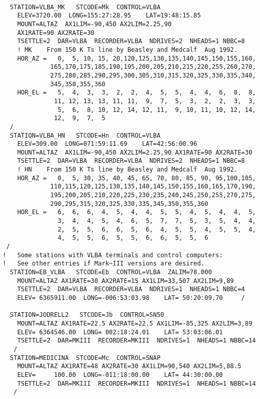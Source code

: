 \documentclass{report}
\begin{document}
\begin{verbatim}

  STATION=VLBA_MK   STCODE=Mk  CONTROL=VLBA
    ELEV=3720.00  LONG=155:27:28.95    LAT=19:48:15.85
    MOUNT=ALTAZ  AX1LIM=-90,450 AX2LIM=2.25,90
    AX1RATE=90 AX2RATE=30
    TSETTLE=2  DAR=VLBA  RECORDER=VLBA  NDRIVES=2  NHEADS=1 NBBC=8
    ! MK    From 150 K Ts line by Beasley and Medcalf  Aug 1992.
    HOR_AZ =   0,  5, 10, 15, 20,120,125,130,135,140,145,150,155,160,
             165,170,175,185,190,195,200,205,210,215,220,255,260,270,
             275,280,285,290,295,300,305,310,315,320,325,330,335,340,
             345,350,355,360
    HOR_EL =   5,  4,  3,  3,  2,  2,  4,  5,  5,  4,  4,  6,  8,  8,
              11, 12, 13, 13, 11, 11,  9,  7,  5,  3,  2,  2,  3,  3,
               5,  6,  8, 10, 12, 14, 12, 11,  9, 10, 11, 10, 12, 14,
              12,  9,  7,  5
  /
  STATION=VLBA_HN   STCODE=Hn  CONTROL=VLBA
    ELEV=309.00  LONG=071:59:11.69    LAT=42:56:00.96
    MOUNT=ALTAZ  AX1LIM=-90,450 AX2LIM=2.25,90 AX1RATE=90 AX2RATE=30
    TSETTLE=2  DAR=VLBA  RECORDER=VLBA  NDRIVES=2  NHEADS=1 NBBC=8
    ! HN    From 150 K Ts line by Beasley and Medcalf  Aug 1992.
    HOR_AZ =   0,  5, 30, 35, 40, 45, 65, 70, 80, 85, 90, 95,100,105,
             110,115,120,125,130,135,140,145,150,155,160,165,170,190,
             195,200,205,210,220,225,230,235,240,245,250,255,270,275,
             290,295,315,320,325,330,335,345,350,355,360
    HOR_EL =   6,  6,  6,  4,  5,  4,  4,  5,  5,  4,  5,  4,  4,  5,
               3,  4,  4,  5,  4,  6,  5,  7,  7,  5,  3,  5,  4,  4,
               2,  5,  5,  6,  6,  5,  6,  4,  5,  5,  4,  5,  5,  4,
               4,  5,  5,  6,  5,  5,  6,  6,  5,  5,  6
 /
!   Some stations with VLBA terminals and control computers:
!   See other entries if Mark~III versions are desired.
  STATION=EB_VLBA   STCODE=Eb  CONTROL=VLBA  ZALIM=78.000
    MOUNT=ALTAZ AX1RATE=30 AX2RATE=15 AX1LIM=33,507 AX2LIM=9,89
    TSETTLE=2  DAR=VLBA  RECORDER=VLBA  NDRIVES=1  NHEADS=1 NBBC=4
    ELEV= 6365911.00  LONG=-006:53:03.98    LAT= 50:20:09.70     /

  STATION=JODRELL2   STCODE=Jb  CONTROL=SN50
    MOUNT=ALTAZ AX1RATE=22.5 AX2RATE=22.5 AX1LIM=-85,325 AX2LIM=3,89
    ELEV= 6364546.00  LONG= 002:18:24.01    LAT= 53:03:06.01
    TSETTLE=2  DAR=MKIII  RECORDER=MKIII  NDRIVES=1  NHEADS=1 NBBC=14
   /
  STATION=MEDICINA  STCODE=Mc  CONTROL=SNAP
    MOUNT=ALTAZ AX1RATE=48 AX2RATE=30 AX1LIM=90,540 AX2LIM=5,88.5
    ELEV=     100.00  LONG=-011:18:00.00    LAT= 44:30:00.00
    TSETTLE=2  DAR=MKIII  RECORDER=MKIII  NDRIVES=1  NHEADS=1 NBBC=14
   /

\end{verbatim}
\end{document}
